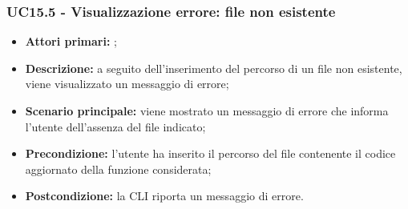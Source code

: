 \subsubsection{UC15.5 - Visualizzazione errore: file non esistente}
\begin{itemize}
	\item \textbf{Attori primari:} \us{};
	\item \textbf{Descrizione:} a seguito dell’inserimento del percorso di un file non esistente, viene visualizzato un messaggio di errore;  
	\item \textbf{Scenario principale:} viene mostrato un messaggio di errore che informa l’utente dell’assenza del file indicato; 
	\item \textbf{Precondizione:} l’utente ha inserito il percorso del file contenente il codice aggiornato della funzione considerata;  
	\item \textbf{Postcondizione:} la CLI riporta un messaggio di errore. 
\end{itemize}